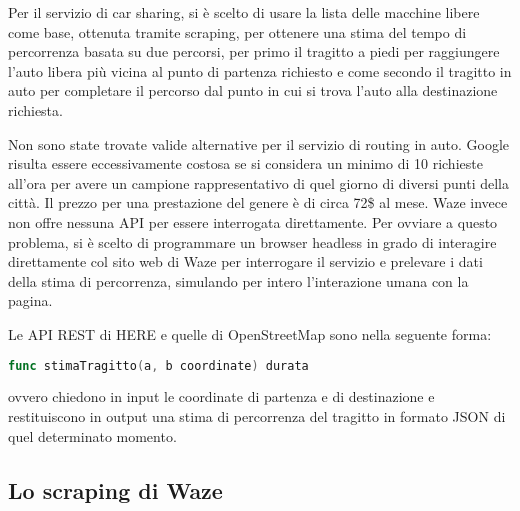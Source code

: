 Per il servizio di car sharing, si è scelto di usare la lista delle macchine libere come base, ottenuta tramite scraping, per ottenere una stima del tempo di percorrenza basata su due percorsi, per primo il tragitto a piedi per raggiungere l'auto libera più vicina al punto di partenza richiesto e come secondo il tragitto in auto per completare il percorso dal punto in cui si trova l'auto alla destinazione richiesta.

Non sono state trovate valide alternative per il servizio di routing in auto. Google risulta essere eccessivamente costosa se si considera un minimo di 10 richieste all'ora per avere un campione rappresentativo di quel giorno di diversi punti della città. Il prezzo per una prestazione del genere è di circa 72\$ al mese. Waze invece non offre nessuna API per essere interrogata direttamente. Per ovviare a questo problema, si è scelto di programmare un browser headless in grado di interagire direttamente col sito web di Waze per interrogare il servizio e prelevare i dati della stima di percorrenza, simulando per intero l'interazione umana con la pagina.

Le API REST di HERE e quelle di OpenStreetMap sono nella seguente forma:
\begin{lstlisting}[language=Go]
func stimaTragitto(a, b coordinate) durata
\end{lstlisting}
ovvero chiedono in input le coordinate di partenza e di destinazione e restituiscono in output una stima di percorrenza del tragitto in formato JSON di quel determinato momento.

\subsection{Lo scraping di Waze}

